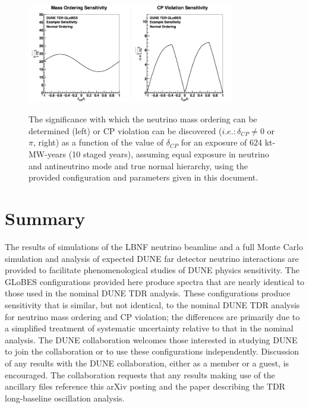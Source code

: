 \documentclass[aps,prd,superscriptaddress]{revtex4-1}
\newcommand{\dcp}{\mbox{$\delta_{CP}$}}
\begin{document}
\begin{figure}[!htpb]
  \centering
  \includegraphics[width=0.4\textwidth]{mh_globes.png}
    \includegraphics[width=0.4\textwidth]{cpv_globes.png}
    \caption{The significance with which the neutrino mass ordering can be determined (left) or CP violation can be
      discovered ($i.e.: \dcp \ne 0$ or $\pi$, right)
      as a function of the value of $\dcp$ for an exposure of 624 kt-MW-years (10 staged years),
      assuming equal exposure in neutrino and antineutrino
      mode and true normal hierarchy, using the provided configuration and parameters given in this document.}
  \label{fig:osc_sens}
\end{figure}

\section{Summary}
The results of simulations of the LBNF neutrino beamline and a full Monte Carlo simulation and analysis of
expected DUNE far detector neutrino interactions are provided to facilitate phenomenological studies of DUNE
physics sensitivity. The GLoBES configurations provided here produce spectra that are nearly identical to those
used in the nominal DUNE TDR analysis. These configurations produce sensitivity that is similar, but not identical,
to the nominal DUNE TDR analysis for 
neutrino mass ordering and CP violation; the differences are primarily due to a simplified treatment
of systematic uncertainty relative to that in the nominal analysis.
The DUNE collaboration welcomes
those interested in studying DUNE to join the collaboration or to use these configurations independently.
Discussion of any results with the DUNE collaboration, either as a member or a guest, is encouraged. The collaboration
requests that any results making use of the ancillary files reference this arXiv posting and the paper
describing the TDR long-baseline oscillation analysis\cite{Abi:2020qib}.



\end{document}
